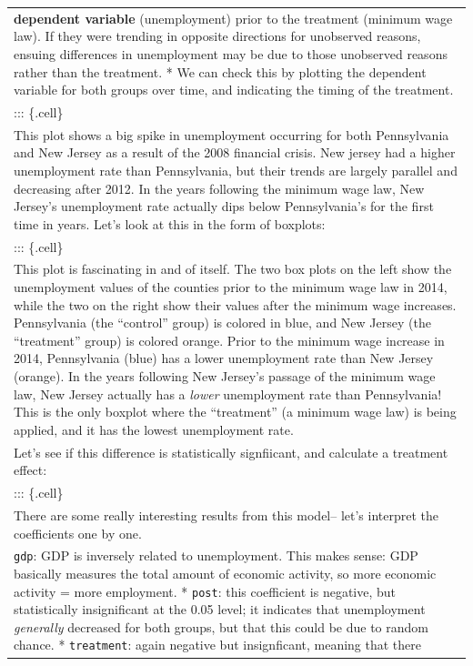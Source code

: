 \documentclass[
  letterpaper,
  DIV=11,
  numbers=noendperiod]{scrreprt}
\begin{document}
\begin{longtable}[]{@{}
  >{\raggedright\arraybackslash}p{}@{}}
\textbf{dependent variable} (unemployment) prior to the treatment
(minimum wage law). If they were trending in opposite directions for
unobserved reasons, ensuing differences in unemployment may be due to
those unobserved reasons rather than the treatment. * We can check this
by plotting the dependent variable for both groups over time, and
indicating the timing of the treatment. \\
::: \{.cell\} \\
This plot shows a big spike in unemployment occurring for both
Pennsylvania and New Jersey as a result of the 2008 financial crisis.
New jersey had a higher unemployment rate than Pennsylvania, but their
trends are largely parallel and decreasing after 2012. In the years
following the minimum wage law, New Jersey's unemployment rate actually
dips below Pennsylvania's for the first time in years. Let's look at
this in the form of boxplots: \\
::: \{.cell\} \\
This plot is fascinating in and of itself. The two box plots on the left
show the unemployment values of the counties prior to the minimum wage
law in 2014, while the two on the right show their values after the
minimum wage increases. Pennsylvania (the ``control'' group) is colored
in blue, and New Jersey (the ``treatment'' group) is colored orange.
Prior to the minimum wage increase in 2014, Pennsylvania (blue) has a
lower unemployment rate than New Jersey (orange). In the years following
New Jersey's passage of the minimum wage law, New Jersey actually has a
\emph{lower} unemployment rate than Pennsylvania! This is the only
boxplot where the ``treatment'' (a minimum wage law) is being applied,
and it has the lowest unemployment rate. \\
Let's see if this difference is statistically signfiicant, and calculate
a treatment effect: \\
::: \{.cell\} \\
There are some really interesting results from this model-- let's
interpret the coefficients one by one. \\
* \texttt{gdp}: GDP is inversely related to unemployment. This makes
sense: GDP basically measures the total amount of economic activity, so
more economic activity = more employment. * \texttt{post}: this
coefficient is negative, but statistically insignificant at the 0.05
level; it indicates that unemployment \emph{generally} decreased for
both groups, but that this could be due to random chance. *
\texttt{treatment}: again negative but insignficant, meaning that there

\end{longtable}
\end{document}
